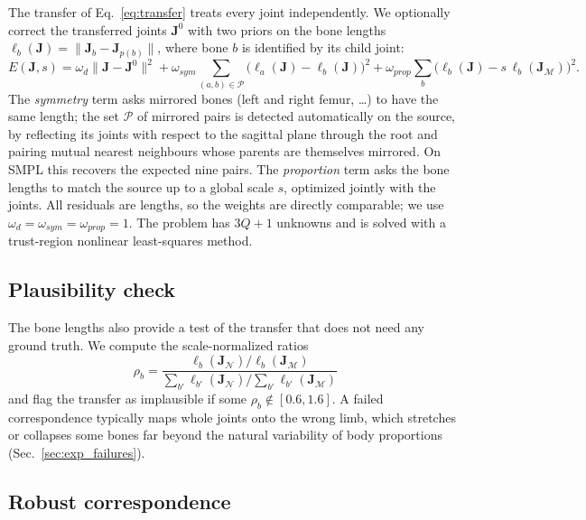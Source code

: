 \documentclass[11pt]{article}
\newcommand{\M}{\mathcal{M}}
\newcommand{\N}{\mathcal{N}}
\newcommand{\J}{\mathbf{J}}
\begin{document}
The transfer of Eq.~\eqref{eq:transfer} treats every joint independently. We
optionally correct the transferred joints $\J^0$ with two priors on the bone
lengths $\ell_b(\J) = \|\J_b - \J_{p(b)}\|$, where bone $b$ is identified by its
child joint:
\begin{equation}
  E(\J, s) = \omega_{d} \|\J - \J^0\|^2
           + \omega_{sym} \!\!\sum_{(a,b) \in \mathcal{P}}\!\! \big(\ell_a(\J) - \ell_b(\J)\big)^2
           + \omega_{prop} \sum_{b} \big(\ell_b(\J) - s\, \ell_b(\J_\M)\big)^2 .
  \label{eq:priors}
\end{equation}
The \emph{symmetry} term asks mirrored bones (left and right femur, \dots) to
have the same length; the set $\mathcal{P}$ of mirrored pairs is detected
automatically on the source, by reflecting its joints with respect to the
sagittal plane through the root and pairing mutual nearest neighbours whose
parents are themselves mirrored. On SMPL this recovers the expected nine
pairs. The \emph{proportion} term asks the bone lengths to match the source
up to a global scale $s$, optimized jointly with the joints. All residuals are
lengths, so the weights are directly comparable; we use
$\omega_d = \omega_{sym} = \omega_{prop} = 1$. The problem has $3Q + 1$ unknowns
and is solved with a trust-region nonlinear least-squares method.

\subsection{Plausibility check}
\label{sec:plausibility}

The bone lengths also provide a test of the transfer that does not need any
ground truth. We compute the scale-normalized ratios
\begin{equation}
  \rho_b = \frac{\ell_b(\J_\N) / \ell_b(\J_\M)}{\sum_{b'} \ell_{b'}(\J_\N) \big/ \sum_{b'} \ell_{b'}(\J_\M)}
\end{equation}
and flag the transfer as implausible if some $\rho_b \notin [0.6, 1.6]$. A
failed correspondence typically maps whole joints onto the wrong limb, which
stretches or collapses some bones far beyond the natural variability of body
proportions (Sec.~\ref{sec:exp_failures}).

\subsection{Robust correspondence}
\label{sec:robust}
\end{document}
